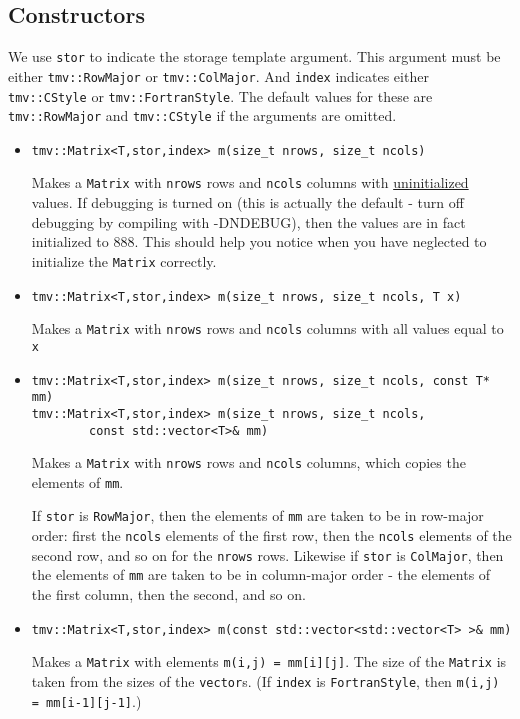 \documentclass[twoside,letterpaper,11pt]{article}
\renewcommand{\tt}[1]{{\texttt {#1}}}
\begin{document}
\subsection{Constructors}

We use \tt{stor} to indicate the storage template argument. 
This argument must be either 
\tt{tmv::RowMajor} or \tt{tmv::ColMajor}.  And \tt{index} indicates either 
\tt{tmv::CStyle} or \tt{tmv::FortranStyle}.  The default values for these
are \tt{tmv::RowMajor} and \tt{tmv::CStyle} if the arguments are omitted.

\begin{itemize}
\item 
\begin{verbatim}
tmv::Matrix<T,stor,index> m(size_t nrows, size_t ncols)
\end{verbatim}
Makes a \tt{Matrix} with \tt{nrows} rows and \tt{ncols} columns with 
\underline{uninitialized} values.
If debugging is turned on (this is actually the default -
turn off debugging by compiling
with -DNDEBUG), then the values are in fact initialized to 888.  
This should help you notice
when you have neglected to initialize the \tt{Matrix} correctly.

\item
\begin{verbatim}
tmv::Matrix<T,stor,index> m(size_t nrows, size_t ncols, T x)
\end{verbatim}
Makes a \tt{Matrix} with \tt{nrows} rows and \tt{ncols} columns with all 
values equal to \tt{x}

\item
\begin{verbatim}
tmv::Matrix<T,stor,index> m(size_t nrows, size_t ncols, const T* mm)
tmv::Matrix<T,stor,index> m(size_t nrows, size_t ncols, 
        const std::vector<T>& mm)
\end{verbatim}
Makes a \tt{Matrix} with \tt{nrows} rows and \tt{ncols} columns,
which copies the elements of \tt{mm}.

If \tt{stor} is \tt{RowMajor}, then the elements of \tt{mm} are taken to
be in row-major order: first the \tt{ncols} elements of the first row, then the
\tt{ncols} elements of the second row, and so on for the \tt{nrows} rows.
Likewise if \tt{stor} is \tt{ColMajor},
then the elements of \tt{mm} are taken to be in column-major order - 
the elements of the first column, then the second, and so on.

\item
\begin{verbatim}
tmv::Matrix<T,stor,index> m(const std::vector<std::vector<T> >& mm)
\end{verbatim}
Makes a \tt{Matrix} with elements \tt{m(i,j) = mm[i][j]}.  The size of
the \tt{Matrix} is taken from the sizes of the \tt{vector}s.  
(If \tt{index} is \tt{FortranStyle}, then \tt{m(i,j) = mm[i-1][j-1]}.)


\end{itemize}
\end{document}

